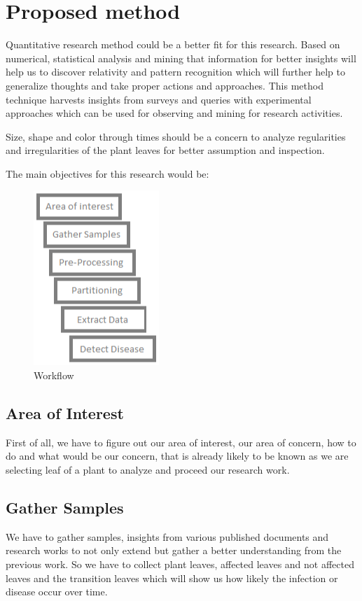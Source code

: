 \documentclass[conference]{IEEEtran}
\begin{document}
\section{Proposed method }
\large 
Quantitative research method could be a better fit for this research.  Based on numerical, statistical analysis and mining that information for better insights will help us to discover relativity and pattern recognition which will further help to generalize thoughts and take proper actions and approaches. This method technique harvests insights from surveys and queries with experimental approaches which can be used for observing and mining for research activities.

Size, shape and color through times should be a concern to analyze regularities and irregularities of the plant leaves for better assumption and inspection.

The main objectives for this research would be:

\begin{figure}
\centering
\caption{Workflow}
\includegraphics[scale=0.65]{workflow2.png}
\end{figure}

\vfill\null

\subsection{Area of Interest}
First of all, we have to figure out our area of interest, our area of concern, how to do and what would be our concern, that is already likely to be known as we are selecting leaf of a plant to analyze and proceed our research work.



\subsection{Gather Samples}
We have to gather samples, insights from various published documents and research works to not only extend but gather a better understanding from the previous work. So we have to collect plant leaves, affected leaves and not affected leaves and the transition leaves which will show us how likely the infection or disease occur over time.
\end{document}

